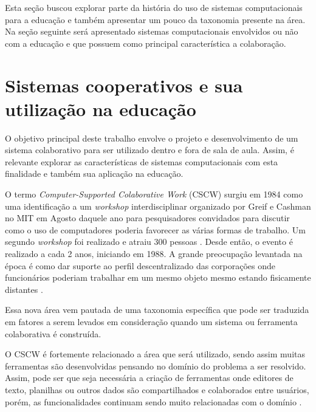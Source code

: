 Esta seção buscou explorar parte da história do uso de sistemas computacionais para a educação e também apresentar um pouco da taxonomia presente na área. Na seção seguinte será apresentado sistemas computacionais envolvidos ou não com a educação e que possuem como principal característica a colaboração.



\section{Sistemas cooperativos e sua utilização na educação}


O objetivo principal deste trabalho envolve o projeto e desenvolvimento de um sistema colaborativo para ser utilizado dentro e fora de sala de aula. Assim, é relevante explorar as características de sistemas computacionais com esta finalidade e também sua aplicação na educação.

O termo \emph{Computer-Supported Colaborative Work} (CSCW) surgiu em 1984 como uma identificação a um \emph{workshop} interdisciplinar organizado por Greif e Cashman no MIT em Agosto daquele ano para pesquisadores convidados para discutir como o uso de computadores poderia favorecer as várias formas de trabalho. Um segundo \emph{workshop} foi realizado e atraiu 300 pessoas \cite{greif1988}. Desde então, o evento é realizado a cada 2 anos, iniciando em 1988. A grande preocupação levantada na época é como dar suporte ao perfil descentralizado das corporações onde funcionários poderiam trabalhar em um mesmo objeto mesmo estando fisicamente distantes \cite{reinhard_cscw_1994}.

Essa nova área vem pautada de uma taxonomia específica que pode ser traduzida em fatores a serem levados em consideração quando um sistema ou ferramenta colaborativa é construída.

O CSCW é fortemente relacionado a área que será utilizado, sendo assim muitas ferramentas são desenvolvidas pensando no domínio do problema a ser resolvido. Assim, pode ser que seja necessária a criação de ferramentas onde editores de texto, planilhas ou outros dados são compartilhados e colaborados entre usuários, porém, as funcionalidades continuam sendo muito relacionadas com o domínio \cite{reinhard_cscw_1994}.

